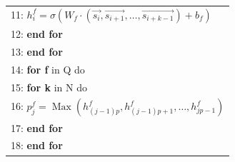\documentclass{ieeeaccess}
\begin{document}
\begin{table}[htp]
\begin{tabular}{l}
11: \hspace{6pt} $h_{i}^{f}=\sigma\left(W_{f} \cdot(\overrightarrow{s_{i}}, \overrightarrow{s_{i+1}}, \ldots, \overrightarrow{s_{i+k-1}})+b_{f}\right)$                                                                                                           \\
12: \hspace{3pt} \textbf{end for}                                                                                                                                                                                                                 \\
13: \textbf{end for}                                                                                                                                                                                                                                               \\
14: \textbf{for f} in Q do                                                                                                                                                                                                                                          \\
15: \hspace{3pt} \textbf{for k} in N do                                                                                                                                                                                                            \\
16: \hspace{6pt} $p_{j}^{f}=\operatorname{Max}\left(h_{(j-1) p}^{f}, h_{(j-1) p+1}^{f}, \ldots, h_{j p-1}^{f}\right)$                                                                                                                                               \\
17: \hspace{3pt} \textbf{end for}                                                                                                                                                                                                                 \\
18: \textbf{end for}                                                                                                                                                                                                                                               \\


\end{tabular}
\end{table}
\end{document}
